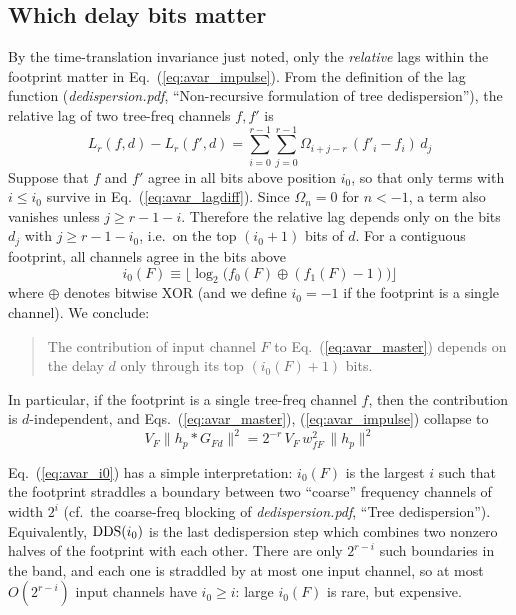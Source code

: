 \documentclass{article}
\numberwithin{equation}{section}   %
\def\DDS{{\rm DDS}}
\newcommand{\ddnotes}[1]{{\em dedispersion.pdf}, ``#1''}
\begin{document}
\subsection{Which delay bits matter}
\label{sec:avar_dbits}

By the time-translation invariance just noted, only the {\em relative} lags within the footprint
matter in Eq.\ (\ref{eq:avar_impulse}). From the definition of the lag function
(\ddnotes{Non-recursive formulation of tree dedispersion}),
the relative lag of two tree-freq channels $f,f'$ is
\begin{equation}
L_r(f,d) - L_r(f',d) = \sum_{i=0}^{r-1} \sum_{j=0}^{r-1} \Omega_{i+j-r} \, (f'_i - f_i) \, d_j
  \label{eq:avar_lagdiff}
\end{equation}
Suppose that $f$ and $f'$ agree in all bits above position $i_0$, so that only terms with
$i \le i_0$ survive in Eq.\ (\ref{eq:avar_lagdiff}). Since $\Omega_n = 0$ for $n < -1$, a term also
vanishes unless $j \ge r-1-i$. Therefore the relative lag depends only on the bits $d_j$ with
$j \ge r-1-i_0$, i.e.\ on the top $(i_0+1)$ bits of $d$.
For a contiguous footprint, all channels agree in the bits above
\begin{equation}
i_0(F) \equiv \Big\lfloor \log_2 \big( f_0(F) \oplus (f_1(F)-1) \big) \Big\rfloor
  \label{eq:avar_i0}
\end{equation}
where $\oplus$ denotes bitwise XOR (and we define $i_0=-1$ if the footprint is a single channel).
We conclude:
\begin{quote}
The contribution of input channel $F$ to Eq.\ (\ref{eq:avar_master}) depends on the delay $d$ only
through its top $(i_0(F)+1)$ bits.
\end{quote}
In particular, if the footprint is a single tree-freq channel $f$, then the contribution is
$d$-independent, and Eqs.\ (\ref{eq:avar_master}), (\ref{eq:avar_impulse}) collapse to
\begin{equation}
V_F \big\| h_p * G_{Fd} \big\|^2 = 2^{-r} \, V_F \, w_{fF}^2 \, \|h_p\|^2
\end{equation}

Eq.\ (\ref{eq:avar_i0}) has a simple interpretation: $i_0(F)$ is the largest $i$ such that the
footprint straddles a boundary between two ``coarse'' frequency channels of width $2^i$
(cf.\ the coarse-freq blocking of \ddnotes{Tree dedispersion}). Equivalently, $\DDS(i_0)$ is
the last dedispersion step which
combines two nonzero halves of the footprint with each other. There are only $2^{r-i}$ such
boundaries in the band, and each one is straddled by at most one input channel, so at most
$O(2^{r-i})$ input channels have $i_0 \ge i$: large $i_0(F)$ is rare, but expensive.
\end{document}
